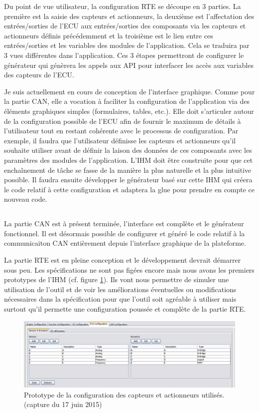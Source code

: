 Du point de vue utilisateur, la configuration RTE se découpe en 3 parties. La
première est la saisie des capteurs et actionneurs, la deuxième est
l'affectation des entrées/sorties de l'ECU aux entrées/sorties des composants
via les capteurs et actionneurs définis précédemment et la troisième est le lien
entre ces entrées/sorties et les variables des modules de l'application. Cela se
traduira par 3 vues différentes dans l'application. Ces 3 étapes permettront de
configurer le générateur qui génèrera les appels aux API pour interfacer les
accès aux variables des capteurs de l'ECU.

Je suis actuellement en cours de conception de l'interface graphique. Comme pour
la partie CAN, elle a vocation à faciliter la configuration de l'application via
des éléments graphiques simples (formulaires, tables, etc.). 
Elle doit s'articuler autour de la configuration possible de l'ECU afin de
fournir le maximum de détails à l'utilisateur tout en restant cohérente avec le
processus de configuration. Par exemple, il faudra que l'utilisateur définisse
les capteurs et actionneurs qu'il souhaite utiliser avant de définir la laison
des données de ces composants avec les paramètres des modules de l'application.
L'IHM doit être construite pour que cet enchaînement de tâche se fasse de la
manière la plus naturelle et la plus intuitive possible.  Il faudra ensuite
développer le générateur basé sur cette IHM qui créera le code relatif à cette
configuration et adaptera la \og glue \fg{} pour prendre en compte ce nouveau
code.


\subsection*{}
La partie CAN est à présent terminée, l'interface est complète et le générateur
fonctionnel. Il est désormais possible de configurer et généré le code relatif à
la communicaiton CAN entièrement depuis l'interface graphique de la plateforme.

La partie RTE est en pleine conception et le développement devrait démarrer
sous peu. Les spécifications ne sont pas figées
encore mais nous avons les premiers prototypes de l'IHM (cf. figure
\ref{fig:rte_conf}). Ils vont nous permettre
de simuler une utilisation de l'outil et de voir les améliorations éventuelles
ou modifications nécessaires dans la spécification pour que l'outil soit agréable
à utiliser mais surtout qu'il permette une configuration poussée et complète de
la partie RTE.

\begin{figure}[h]
  \centering
  \includegraphics[scale=0.45]{images/rte_conf}
  \caption{Prototype de la configuration des capteurs et actionneurs utilisés. (capture du 17 juin 2015)}
  \label{fig:rte_conf}
\end{figure}



